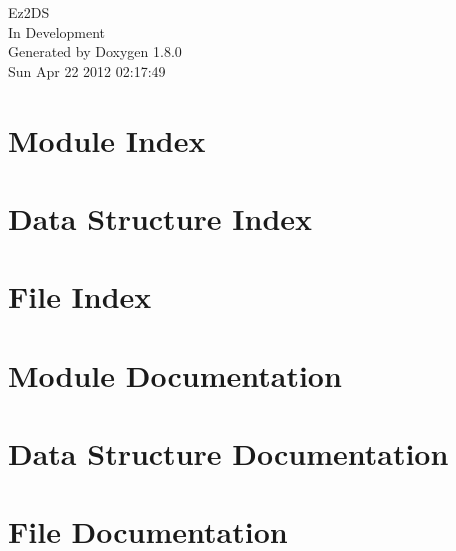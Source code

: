 \documentclass{book}
\begin{document}
\hypersetup{pageanchor=false,citecolor=blue}
\begin{titlepage}
\vspace*{7cm}
\begin{center}
{\Large Ez2\-D\-S \\[1ex]\large In Development }\\
\vspace*{1cm}
{\large Generated by Doxygen 1.8.0}\\
\vspace*{0.5cm}
{\small Sun Apr 22 2012 02:17:49}\\
\end{center}
\end{titlepage}
\clearemptydoublepage
{}
\tableofcontents
\clearemptydoublepage
{}
\hypersetup{pageanchor=true,citecolor=blue}
\chapter{Module Index}

\chapter{Data Structure Index}

\chapter{File Index}

\chapter{Module Documentation}





\chapter{Data Structure Documentation}












\chapter{File Documentation}






\printindex
\end{document}
